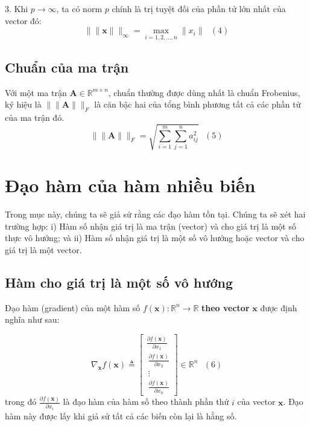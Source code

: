 3. Khi $p \rightarrow \infty $, ta có norm $p$ chính là trị tuyệt đối của phần tử lớn nhất của vector đó: 
\begin{equation*} 
\|\|\mathbf{x}\|\|_{\infty} = \max_{i = 1, 2, \dots, n} \|x_i\| ~~~ (4) 
\end{equation*} 
 
 
\subsection{Chuẩn của ma trận}
Với một ma trận $\mathbf{A} \in \mathbb{R}^{m\times n}$, chuẩn thường được dùng nhất là chuẩn Frobenius, ký hiệu là $\|\|\mathbf{A}\|\|_F$ là căn bậc hai của tổng bình phương tất cả các phần tử của ma trận đó.  
\begin{equation*} 
\|\|\mathbf{A}\|\|_F = \sqrt{\sum_{i = 1}^m \sum_{j = 1}^n a_{ij}^2} ~~~ (5) 
\end{equation*} 
 
 
 
 
\section{Đạo hàm của hàm nhiều biến }
Trong mục này, chúng ta sẽ giả sử rằng các đạo hàm tồn tại. Chúng ta sẽ xét hai trường hợp: i) Hàm số nhận giá trị là ma trận (vector) và cho giá trị là một số thực vô hướng; và ii) Hàm số nhận giá trị là một số vô hướng hoặc vector và cho giá trị là một vector.  
 
 
\subsection{Hàm cho giá trị là một số vô hướng}
 
Đạo hàm (gradient) của một hàm số $f(\mathbf{x}): \mathbb{R}^n \rightarrow \mathbb{R}$ \textbf{theo vector} $\mathbf{x}$ được định nghĩa như sau:  
 
\begin{equation*} 
\nabla_{\mathbf{x}} f(\mathbf{x}) \triangleq  
\left[ 
\begin{matrix} 
\frac{\partial f(\mathbf{x})}{\partial x_1} \\\ 
\frac{\partial f(\mathbf{x})}{\partial x_2} \\\ 
\vdots \\\ 
\frac{\partial f(\mathbf{x})}{\partial x_n} 
\end{matrix} 
\right] \in \mathbb{R}^n ~~~ (6) 
\end{equation*} 
trong đó $\frac{\partial f(\mathbf{x})}{\partial x_i}$ là đạo hàm của hàm số theo thành phần thứ $i$ của vector $\mathbf{x}$. Đạo hàm này được lấy khi giả sử tất cả các biến còn lại là hằng số. 
 
